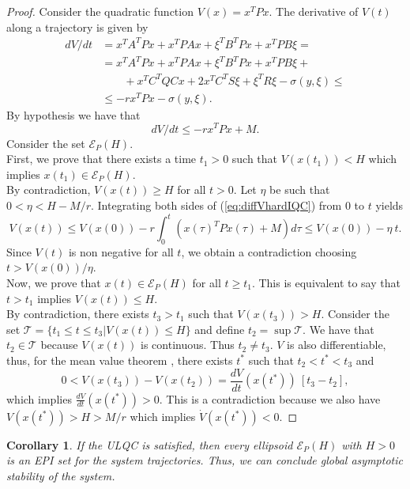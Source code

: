 \documentclass[letterpaper,10pt,conference,twocolumn]{IEEEtran}
\newtheorem{cor}[thm]{Corollary}
\newcommand{\ellips}{\mathcal{E}}
\begin{document}
\begin{proof}
	Consider the quadratic function $V(x)=x^TPx$.
	The derivative of $V(t)$ along a trajectory is given by
	\begin{align*}
		dV/dt&=x^TA^TPx+x^TPAx+\xi^T B^T Px + x^T P B\xi=\\
			&=x^TA^TPx+x^TPAx+\xi^T B^T Px + x^T P B\xi+\\
			&\qquad +x^TC^TQCx+2x^TC^TS\xi+\xi^TR\xi-\sigma(y,\xi)\leq\\
			&\leq -r x^TPx -\sigma(y,\xi).
	\end{align*}
	By hypothesis we have that
	\begin{equation}\label{eq:diffVhardIQC}
		dV/dt \leq -r x^TPx +M.
	\end{equation}
	Consider the set $\ellips_P(H)$.\\
	First, we prove that there exists a time $t_1>0$ such that
	$V(x(t_1))<H$ which implies $x(t_1)\in \ellips_P(H)$.\\
	By contradiction, $V(x(t))\geq H$ for all $t>0$.
	Let $\eta$ be such that $0<\eta<H-M/r$.
	Integrating both sides of (\ref{eq:diffVhardIQC}) from $0$ to $t$ yields
	\begin{equation*}
		V(x(t)) \leq V(x(0))-r \int_0^t (x(\tau)^TPx(\tau) +M)d\tau
			\leq V(x(0)) -\eta~t.
	\end{equation*}
	Since $V(t)$ is non negative for all $t$, we obtain a contradiction
	choosing $t>V(x(0))/\eta$.\\
	Now, we prove that $x(t)\in \ellips_P(H)$ for all $t\geq t_1$.
	This is equivalent to say that $t>t_1$ implies $V(x(t))\leq H$.\\
	By contradiction, there exists $t_3>t_1$ such that $V(x(t_3))>H$.
	Consider the set $\mathcal{T}=\{t_1\leq t \leq t_3| V(x(t))\leq H\}$
	and define $t_2=\sup \mathcal{T}$. We have that $t_2\in \mathcal{T}$
	because $V(x(t))$ is continuous. Thus $t_2 \neq t_3$.
	$V$ is also differentiable, thus, for the mean value theorem \cite{Rudin76}, there exists $t^*$ such that $t_2<t^*<t_3$ and
	\begin{equation*}
		0<V(x(t_3))-V(x(t_2))=\frac{dV}{dt}(x(t^*))~[t_3 -t_2],
	\end{equation*}
	which implies $\frac{dV}{dt}(x(t^*))>0$.
	This is a contradiction because we also have $V(x(t^*))>H>M/r$
	which implies $\dot V(x(t^*))<0$.
\end{proof}
\begin{cor}
	If the ULQC is satisfied, then every ellipsoid $\ellips_P(H)$ with $H>0$ is an EPI set for the system trajectories. Thus, we can conclude global asymptotic stability of the system.
\end{cor}
\end{document}
